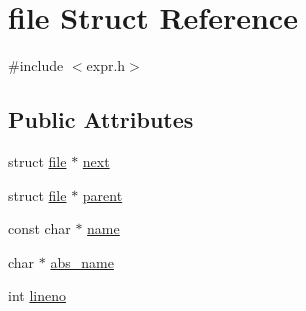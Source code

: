 \hypertarget{structfile}{\section{file Struct Reference}
\label{structfile}
}


{\ttfamily \#include $<$expr.\-h$>$}

\subsection*{Public Attributes}
\begin{DoxyCompactItemize}
\item 
struct \hyperlink{structfile}{file} $\ast$ \hyperlink{structfile_a402d6c3ee49f9e34e6d99b62f5d4ea55}{next}
\item 
struct \hyperlink{structfile}{file} $\ast$ \hyperlink{structfile_aed2f8d9222a34b7cb8a9bd9a4e70343d}{parent}
\item 
const char $\ast$ \hyperlink{structfile_addc5cbde7b4702bc599665409a7cad54}{name}
\item 
char $\ast$ \hyperlink{structfile_a05031f3fbb25adf39442fca9a3bfb6de}{abs\-\_\-name}
\item 
int \hyperlink{structfile_ae204e048bb7c7079f41fb193872db7d4}{lineno}
\end{DoxyCompactItemize}


